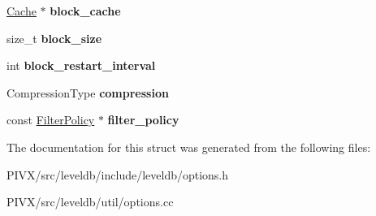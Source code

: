 \begin{DoxyCompactItemize}
\item 
\mbox{\label{structleveldb_1_1_options_a4e87749ebac1ba28dff6bb63eb2059e5}} 
\mbox{\hyperlink{classleveldb_1_1_cache}{Cache}} $\ast$ {\bfseries block\+\_\+cache}
\item 
\mbox{\label{structleveldb_1_1_options_a715c7941b43db641e76e598aa9ab52a0}} 
size\+\_\+t {\bfseries block\+\_\+size}
\item 
\mbox{\label{structleveldb_1_1_options_ac71d66ae44e481edc3922d3a139c30b4}} 
int {\bfseries block\+\_\+restart\+\_\+interval}
\item 
\mbox{\label{structleveldb_1_1_options_abdaf09c8bb3a788636ffb86cb93b01ab}} 
Compression\+Type {\bfseries compression}
\item 
\mbox{\label{structleveldb_1_1_options_a24c88997a866d535e68de15b5c3cd02b}} 
const \mbox{\hyperlink{classleveldb_1_1_filter_policy}{Filter\+Policy}} $\ast$ {\bfseries filter\+\_\+policy}
\end{DoxyCompactItemize}


The documentation for this struct was generated from the following files\+:\begin{DoxyCompactItemize}
\item 
P\+I\+V\+X/src/leveldb/include/leveldb/options.\+h\item 
P\+I\+V\+X/src/leveldb/util/options.\+cc\end{DoxyCompactItemize}
